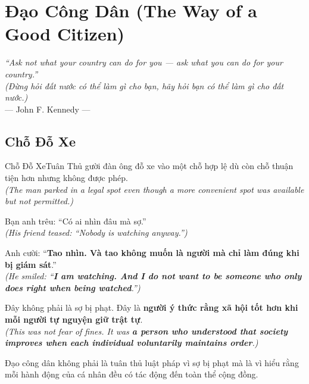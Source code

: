 \chapter{Đạo Công Dân (The Way of a Good Citizen)}

\begin{center}
  \textit{\color{truyenblue}``Ask not what your country can do for you --- ask what you can do for your country.''}\\
  \textit{(Đừng hỏi đất nước có thể làm gì cho bạn, hãy hỏi bạn có thể làm gì cho đất nước.)}\\[4pt]
  \small\color{truyengold}--- John F. Kennedy ---
\end{center}
\ngancach

\section{Chỗ Đỗ Xe}
\begin{truyen}{Chỗ Đỗ Xe}{Tuân Thủ}
gười đàn ông đỗ xe vào một chỗ hợp lệ dù còn chỗ thuận tiện hơn nhưng không được phép.\\
\textit{(The man parked in a legal spot even though a more convenient spot was available but not permitted.)}

Bạn anh trêu: ``Có ai nhìn đâu mà sợ.''\\
\textit{(His friend teased: ``Nobody is watching anyway.'')}

Anh cười: ``\textbf{Tao nhìn. Và tao không muốn là người mà chỉ làm đúng khi bị giám sát}.''\\
\textit{(He smiled: ``\textbf{I am watching. And I do not want to be someone who only does right when being watched}.'')}

Đây không phải là sợ bị phạt. Đây là \textbf{người ý thức rằng xã hội tốt hơn khi mỗi người tự nguyện giữ trật tự}.\\
\textit{(This was not fear of fines. It was \textbf{a person who understood that society improves when each individual voluntarily maintains order}.)}
\end{truyen}
\begin{baihoc}
  Đạo công dân không phải là tuân thủ luật pháp vì sợ bị phạt mà là vì hiểu rằng mỗi hành động của cá nhân đều có tác động đến toàn thể cộng đồng.
\end{baihoc}


